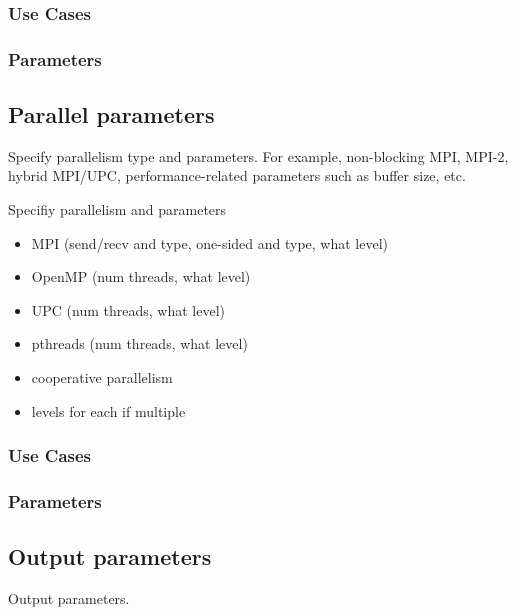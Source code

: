 \subsubsection{Use Cases}
\subsubsection{Parameters}


\subsection{Parallel parameters} \label{ss:params-parallel}

Specify parallelism type and parameters.  For example, non-blocking
MPI, MPI-2, hybrid MPI/UPC, performance-related parameters such as
buffer size, etc.

Specifiy parallelism and parameters

\begin{itemize}
\item MPI (send/recv and type, one-sided and type, what level)
\item OpenMP (num threads, what level)
\item UPC (num threads, what level)
\item pthreads (num threads, what level)
\item cooperative parallelism
\item levels for each if multiple
\end{itemize}


\subsubsection{Use Cases}
\subsubsection{Parameters}


\subsection{Output parameters} \label{ss:params-output}

Output parameters.



